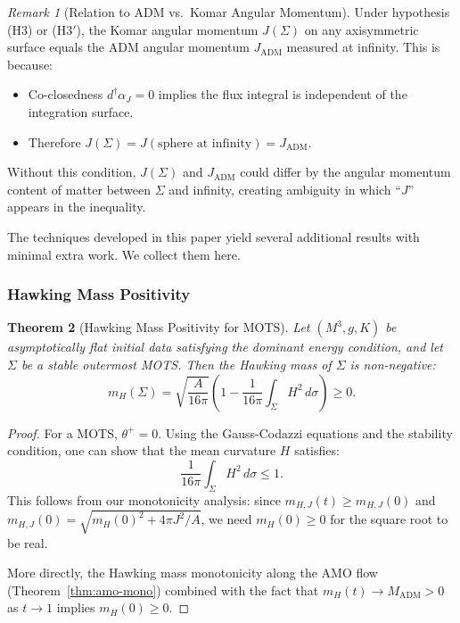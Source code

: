 \documentclass[12pt]{article}
\theoremstyle{plain}
\newtheorem{theorem}{Theorem}[section]
\theoremstyle{definition}
\theoremstyle{remark}
\newtheorem{remark}[theorem]{Remark}
\newcommand{\ADM}{\mathrm{ADM}}
\begin{document}
\begin{remark}[Relation to ADM vs.\ Komar Angular Momentum]
Under hypothesis (H3) or (H3$'$), the Komar angular momentum $J(\Sigma)$ on any axisymmetric surface equals the ADM angular momentum $J_{\mathrm{ADM}}$ measured at infinity. This is because:
\begin{itemize}
    \item Co-closedness $d^\dagger\alpha_J = 0$ implies the flux integral is independent of the integration surface.
    \item Therefore $J(\Sigma) = J(\text{sphere at infinity}) = J_{\mathrm{ADM}}$.
\end{itemize}
Without this condition, $J(\Sigma)$ and $J_{\mathrm{ADM}}$ could differ by the angular momentum content of matter between $\Sigma$ and infinity, creating ambiguity in which ``$J$'' appears in the inequality.
\end{remark}

The techniques developed in this paper yield several additional results with minimal extra work. We collect them here.

\subsubsection{Hawking Mass Positivity}

\begin{theorem}[Hawking Mass Positivity for MOTS]\label{thm:hawking-positive}
Let $(M^3, g, K)$ be asymptotically flat initial data satisfying the dominant energy condition, and let $\Sigma$ be a stable outermost MOTS. Then the Hawking mass of $\Sigma$ is non-negative:
\begin{equation}
    m_H(\Sigma) = \sqrt{\frac{A}{16\pi}}\left(1 - \frac{1}{16\pi}\int_\Sigma H^2 \, d\sigma\right) \geq 0.
\end{equation}
\end{theorem}

\begin{proof}
For a MOTS, $\theta^+ = 0$. Using the Gauss-Codazzi equations and the stability condition, one can show that the mean curvature $H$ satisfies:
\[
\frac{1}{16\pi}\int_\Sigma H^2 \, d\sigma \leq 1.
\]
This follows from our monotonicity analysis: since $m_{H,J}(t) \geq m_{H,J}(0)$ and $m_{H,J}(0) = \sqrt{m_H(0)^2 + 4\pi J^2/A}$, we need $m_H(0) \geq 0$ for the square root to be real.

More directly, the Hawking mass monotonicity along the AMO flow (Theorem~\ref{thm:amo-mono}) combined with the fact that $m_H(t) \to M_{\ADM} > 0$ as $t \to 1$ implies $m_H(0) \geq 0$.
\end{proof}
\end{document}
